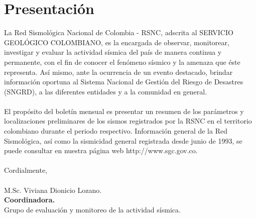 
\chapter{Presentación}

\noindent La Red Sismológica Nacional de Colombia - RSNC, adscrita al SERVICIO GEOLÓGICO COLOMBIANO, es la encargada de observar, monitorear, investigar y evaluar la actividad sísmica del país de manera continua y permanente, con el fin de conocer el fenómeno sísmico y la amenaza que éste representa. Así mismo, ante la ocurrencia de un evento destacado, brindar información oportuna al Sistema Nacional de  Gestión del Riesgo de Desastres (SNGRD), a las diferentes entidades y a la comunidad en general.\\\\


\noindent El propósito del boletín mensual es presentar un resumen de los parámetros y localizaciones preliminares de los sismos registrados por la RSNC en el territorio colombiano durante el periodo respectivo. Información general de la Red Sismológica, así como la sismicidad general registrada desde junio de 1993, se puede consultar en nuestra página web http://www.sgc.gov.co. \\\\



\noindent Cordialmente,  \\\\


\noindent M.Sc. Viviana Dionicio Lozano.\\ 
{\bf \sffamily\textcolor{ocre}{Coordinadora.}}\\ 
Grupo de evaluación y monitoreo de la actividad sísmica.\\

\pagebreak

